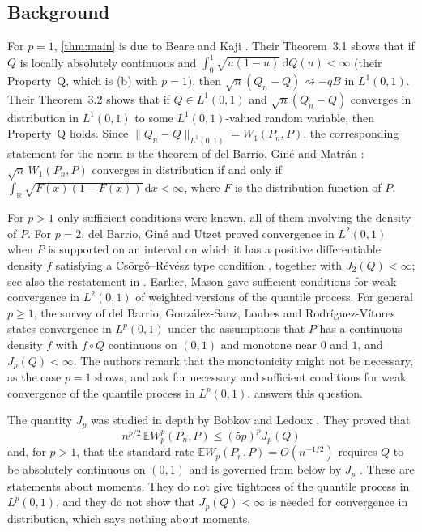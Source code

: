 \documentclass[11pt]{amsart}
\theoremstyle{remark}
\newcommand{\R}{\mathbb{R}}
\newcommand{\E}{\mathbb{E}}
\newcommand{\dd}{\,\mathrm{d}}
\newcommand{\Lp}{L^p(0,1)}
\newcommand{\weak}{\rightsquigarrow}
\begin{document}
\subsection*{Background}
For $p=1$, \cref{thm:main} is due to Beare and Kaji \cite{BeareKaji2025}. Their Theorem~3.1 shows that if $Q$ is locally absolutely continuous and $\int_0^1\sqrt{u(1-u)}\dd Q(u)<\infty$ (their Property~Q, which is (b) with $p=1$), then $\sqrt n(Q_n-Q)\weak -qB$ in $L^1(0,1)$. Their Theorem~3.2 shows that if $Q\in L^1(0,1)$ and $\sqrt n(Q_n-Q)$ converges in distribution in $L^1(0,1)$ to some $L^1(0,1)$-valued random variable, then Property~Q holds. Since $\|Q_n-Q\|_{L^1(0,1)}=W_1(P_n,P)$, the corresponding statement for the norm is the theorem of del Barrio, Gin\'e and Matr\'an \cite{dBGM1999}: $\sqrt n\,W_1(P_n,P)$ converges in distribution if and only if $\int_{\R}\sqrt{F(x)(1-F(x))}\dd x<\infty$, where $F$ is the distribution function of $P$.

For $p>1$ only sufficient conditions were known, all of them involving the density of $P$. For $p=2$, del Barrio, Gin\'e and Utzet \cite{dBGU2005} proved convergence in $L^2(0,1)$ when $P$ is supported on an interval on which it has a positive differentiable density $f$ satisfying a Cs\"org\H{o}--R\'ev\'esz type condition \cite{CsorgoRevesz1978}, together with $J_2(Q)<\infty$; see also the restatement in \cite[Theorem~5.2]{BobkovLedoux2019}. Earlier, Mason \cite{Mason1984} gave sufficient conditions for weak convergence in $L^2(0,1)$ of weighted versions of the quantile process. For general $p\ge1$, the survey of del Barrio, Gonz\'alez-Sanz, Loubes and Rodr\'iguez-V\'itores \cite[Theorem~2.4]{dBGSLRV2025} states convergence in $\Lp$ under the assumptions that $P$ has a continuous density $f$ with $f\circ Q$ continuous on $(0,1)$ and monotone near $0$ and $1$, and $J_p(Q)<\infty$. The authors remark that the monotonicity might not be necessary, as the case $p=1$ shows, and ask \cite[Section~7, Problem~2]{dBGSLRV2025} for necessary and sufficient conditions for weak convergence of the quantile process in $\Lp$.  answers this question.

The quantity $J_p$ was studied in depth by Bobkov and Ledoux \cite{BobkovLedoux2019}. They proved that
\[
n^{p/2}\,\E W_p^p(P_n,P)\le(5p)^pJ_p(Q)
\]
\cite[Theorem~5.3]{BobkovLedoux2019} and, for $p>1$, that the standard rate $\E W_p(P_n,P)=O(n^{-1/2})$ requires $Q$ to be absolutely continuous on $(0,1)$ \cite[Theorem~5.6]{BobkovLedoux2019} and is governed from below by $J_p$ \cite[Theorem~5.9]{BobkovLedoux2019}. These are statements about moments. They do not give tightness of the quantile process in $\Lp$, and they do not show that $J_p(Q)<\infty$ is needed for convergence in distribution, which says nothing about moments.
\end{document}
